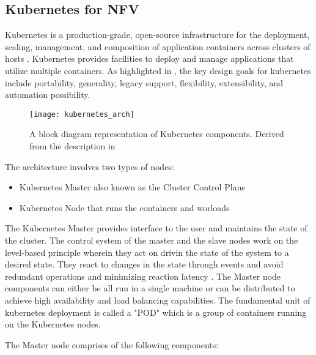 \subsection{Kubernetes for NFV}
	
\begin{flushleft}
    Kubernetes is a production-grade, open-source infrastructure for the deployment, scaling, management, and composition of application containers across clusters of hosts \cite{k8sarch}. Kubernetes provides facilities to deploy and manage applications that utilize multiple containers. As highlighted in \cite{k8sarch}, the key design goals for kubernetes include portability, generality, legacy support, flexibility, extensibility, and automation possibility. 
\end{flushleft}

\begin{figure}
    \centering
    \texttt{[image: kubernetes\_arch]}
    \label{fig:figure16}
    \caption{A block diagram representation of Kubernetes components. Derived from the description in \cite{k8sarch}}
\end{figure}

The architecture involves two types of nodes:
\begin{itemize}
    \item Kubernetes Master also known as the Cluster Control Plane
    \item Kubernetes Node that runs the containers and worloads
\end{itemize}

The Kubernetes Master provides interface to the user and maintains the state of the cluster. The control system of the master and the slave nodes work on the level-based principle wherein they act on drivin the state of the system to a desired state. They react to changes in the state through events and avoid redundant operations and minimizing reaction latency \cite{k8sarch}.
The Master node components can either be all run in a single machine or can be distributed to achieve high availability and load balancing capabilities.
The fundamental unit of kubernetes deployment is called a "POD" which is a group of containers running on the Kubernetes nodes.


The Master node comprises of the following components:

